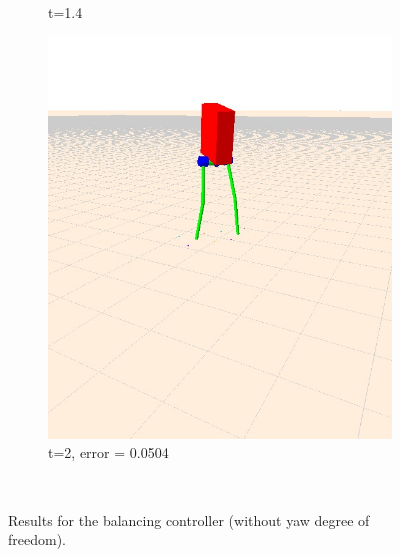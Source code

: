 \documentclass[letterpaper, 10 pt, conference]{ieeeconf}  %
\begin{document}
\begin{figure}[tbp]
\begin{subfigure}[b]{0.3\textwidth}
    \caption{t=1.4}
    \label{fig:balanceNoYaw2}
  \end{subfigure}\hfill
  \begin{subfigure}[b]{0.3\textwidth}
    \centering
    \includegraphics[width=\textwidth] {figures/balanceNoYaw3.jpg} 
    \caption{t=2, error = 0.0504}
    \label{fig:balanceNoYaw3}
  \end{subfigure} \\
  \caption{Results for the balancing controller (without yaw degree of freedom).}
  \label{fig:balancing}
\end{figure}
\end{document}

